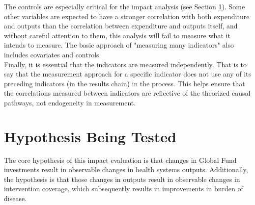 \documentclass[twocolumn]{bmcart}%
\begin{document}
The controls are especially critical for the impact analysis (see Section \ref{hypothesis}). Some other variables are expected to have a stronger correlation with both expenditure and outputs than the correlation between expenditure and outputs itself, and without careful attention to them, this analysis will fail to measure what it intends to measure. The basic approach of "measuring many indicators" also includes covariates and controls. \\

Finally, it is essential that the indicators are measured independently. That is to say that the measurement approach for a specific indicator does not use any of its preceding indicators (in the results chain) in the process. This helps ensure that the correlations measured between indicators are reflective of the theorized causal pathways, not endogeneity in measurement.








\section{Hypothesis Being Tested} \label{hypothesis}

The core hypothesis of this impact evaluation is that changes in Global Fund investments result in observable changes in health systems outputs. Additionally, the hypothesis is that those changes in outputs result in observable changes in intervention coverage, which subsequently results in improvements in burden of disease. \\
\end{document}
